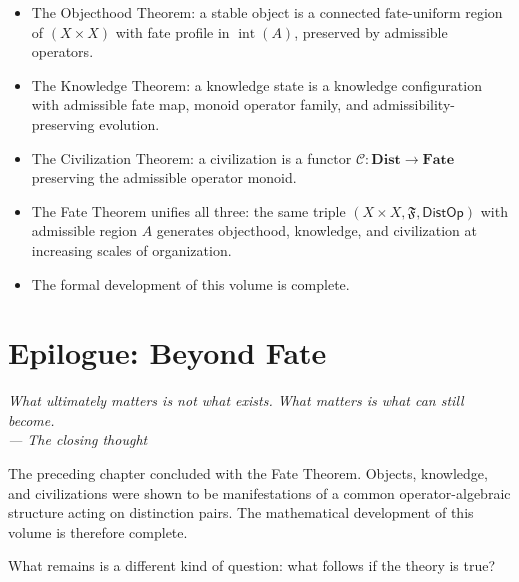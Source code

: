 \documentclass[12pt,twoside,openright]{book}
\newcommand{\fateMap}{\mathfrak{F}}
\newcommand{\distOp}{\mathsf{DistOp}}
\newcommand{\admRegion}{A}
\newcommand{\fateUnif}{\text{fate-uniform}}
\newcommand{\catDist}{\mathbf{Dist}}
\newcommand{\catFate}{\mathbf{Fate}}
\newcommand{\civFunc}{\mathcal{C}}
\newenvironment{epigraph}[2]{%
  \vspace{1em}\begin{flushright}
  \begin{minipage}{0.72\textwidth}
  \itshape\small #1\\[0.4em]
  \upshape\footnotesize\sffamily\color{DistGray}--- #2
  \end{minipage}\end{flushright}\vspace{1.5em}}{}
\newenvironment{chapsummary}{%
  \begin{tcolorbox}[colback=DistBlue!5,colframe=DistBlue,
    title={\faBookOpen\enspace Summary},
    fonttitle=\sffamily\bfseries\color{white},
    attach boxed title to top left={yshift=-2mm,xshift=4mm},
    boxed title style={colback=DistBlue,rounded corners}]
  \begin{itemize}[nosep,leftmargin=*]}{%
  \end{itemize}\end{tcolorbox}}
\providecommand{\admRegion}{A}
\providecommand{\fateUnif}{\text{fate-uniform}}
\providecommand{\catDist}{\mathbf{Dist}}
\providecommand{\catFate}{\mathbf{Fate}}
\providecommand{\civFunc}{\mathcal{C}}
\begin{document}
\begin{chapsummary}
\item The Objecthood Theorem: a stable object is a connected
  $\fateUnif$ region of $(X\times X)$ with fate profile in
  $\operatorname{int}(\admRegion)$, preserved by admissible
  operators.
\item The Knowledge Theorem: a knowledge state is a knowledge
  configuration with admissible fate map, monoid operator
  family, and admissibility-preserving evolution.
\item The Civilization Theorem: a civilization is a functor
  $\civFunc:\catDist\to\catFate$ preserving the admissible
  operator monoid.
\item The Fate Theorem unifies all three: the same triple
  $(X\times X, \fateMap, \distOp)$ with admissible region
  $\admRegion$ generates objecthood, knowledge, and
  civilization at increasing scales of organization.
\item The formal development of this volume is complete.
\end{chapsummary}



\chapter{Epilogue: Beyond Fate}
\label{ch:epilogue}

\begin{epigraph}{What ultimately matters is not what exists.
  What matters is what can still become.}{The closing thought}
\end{epigraph}

The preceding chapter concluded with the Fate Theorem. Objects,
knowledge, and civilizations were shown to be manifestations of
a common operator-algebraic structure acting on distinction
pairs. The mathematical development of this volume is therefore
complete.

What remains is a different kind of question: what follows if
the theory is true?
\end{document}
